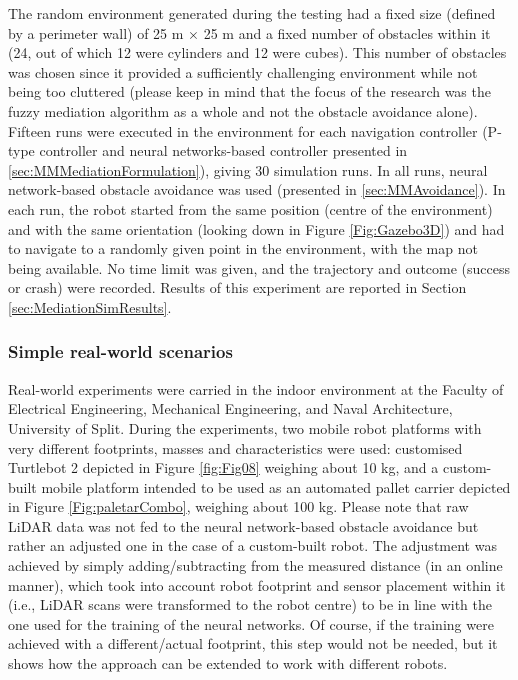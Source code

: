 The random environment generated during the testing had a fixed size (defined by a perimeter wall) of 25 m $\times$ 25 m and a fixed number of obstacles within it (24, out of which 12 were cylinders and 12 were cubes). This number of obstacles was chosen since it provided a sufficiently challenging environment while not being too cluttered (please keep in mind that the focus of the research was the fuzzy mediation algorithm as a whole and not the obstacle avoidance alone). Fifteen runs were executed in the environment for each navigation controller (P-type controller and neural networks-based controller presented in \cref{sec:MMMediationFormulation}), giving 30 simulation runs. In all runs, neural network-based obstacle avoidance was used (presented in \cref{sec:MMAvoidance}). In each run, the robot started from the same position (centre of the environment) and with the same orientation (looking down in Figure \ref{Fig:Gazebo3D}) and had to navigate to a randomly given point in the environment, with the map not being available. No time limit was given, and the trajectory and outcome (success or crash) were recorded. Results of this experiment are reported in Section \ref{sec:MediationSimResults}.

\subsubsection{Simple real-world scenarios} \label{sec:MediationReal}
Real-world experiments were carried in the indoor environment at the Faculty of Electrical Engineering, Mechanical Engineering, and Naval Architecture, University of Split. During the experiments, two mobile robot platforms with very different footprints, masses and characteristics were used: customised Turtlebot 2 depicted in Figure \ref{fig:Fig08} weighing about 10 kg, and a custom-built mobile platform intended to be used as an automated pallet carrier depicted in Figure \ref{Fig:paletarCombo}, weighing about 100 kg. Please note that raw LiDAR data was not fed to the neural network-based obstacle avoidance but rather an adjusted one in the case of a custom-built robot. The adjustment was achieved by simply adding/subtracting from the measured distance (in an online manner), which took into account robot footprint and sensor placement within it (i.e., LiDAR scans were transformed to the robot centre) to be in line with the one used for the training of the neural networks. Of course, if the training were achieved with a different/actual footprint, this step would not be needed, but it shows how the approach can be extended to work with different robots.

